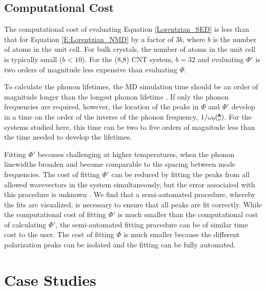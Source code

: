 \subsection{\label{Subsection_Comp_Details_4}Computational Cost}
The computational cost of evaluating Equation \eqref{Lorentzian_SED} is 
less than that for 
Equation \eqref{E:Lorentzian_NMD} by a factor of $3b$, where $b$ is the 
number of atoms in the 
unit cell.  For bulk crystals, the number of atoms in the unit cell is 
typically small 
($b<10$).  For the (8,8) CNT system, $b=32$ and evaluating $\Phi'$ is 
two orders of magnitude 
less expensive than evaluating $\Phi$.

To calculate the phonon lifetimes, the MD simulation time should be an 
order of magnitude 
longer than the longest phonon lifetime \cite{thomas_water_2010}.  
If only the 
phonon frequencies 
are required, however, the location of the peaks in $\Phi$ and $\Phi'$ 
develop in a time on 
the order of the inverse of the phonon frequency, $1/\omega_0\mspace{-4.0mu}\left(\mspace{-8.0mu} \begin{smallmatrix}&\pmb{\kappa} \\&\nu \end{smallmatrix}\mspace{-3.0mu}\right)$. For the 
systems studied 
here, this time can be two to five orders of magnitude less than the time 
needed to develop 
the lifetimes.

Fitting $\Phi'$ becomes challenging at higher temperatures, when the 
phonon linewidths 
broaden and become comparable to the spacing between mode frequencies. 
The cost of 
fitting $\Phi'$ can be reduced by fitting the peaks from all allowed 
wavevectors in the 
system simultaneously, but the error associated with this procedure is 
unknown 
\cite{shiomi_thermal_2011}. We find that a semi-automated procedure, 
whereby the fits are 
visualized, is necessary to ensure that all peaks are fit correctly.  
While the 
computational cost of fitting $\Phi'$ is much smaller than the 
computational cost of 
calculating $\Phi'$, the semi-automated fitting procedure can be of 
similar time cost 
to the user. The cost of fitting $\Phi$ is much smaller because the 
different polarization 
peaks can be isolated and the fitting can be fully automated.
\section{\label{S:Section_Prop}Case Studies}

